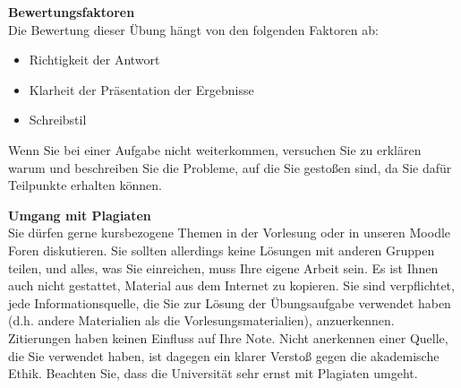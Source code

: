 \textbf{Bewertungsfaktoren}\\
Die Bewertung dieser Übung hängt von den folgenden Faktoren ab:
\begin{itemize}
    \item Richtigkeit der Antwort
    \item Klarheit der Präsentation der Ergebnisse
    \item Schreibstil
\end{itemize}
Wenn Sie bei einer Aufgabe nicht weiterkommen, versuchen Sie zu erklären warum und beschreiben Sie die Probleme, auf die Sie gestoßen sind,
da Sie dafür Teilpunkte erhalten können.


\textbf{Umgang mit Plagiaten}\\
Sie dürfen gerne kursbezogene Themen in der Vorlesung oder in unseren Moodle Foren diskutieren.
Sie sollten allerdings keine Lösungen mit anderen Gruppen teilen, und alles, was Sie einreichen, muss Ihre eigene Arbeit sein. Es ist Ihnen auch nicht gestattet, Material aus dem Internet zu kopieren. Sie sind verpflichtet, jede Informationsquelle, die Sie zur Lösung der Übungsaufgabe verwendet haben (d.h. andere Materialien als die Vorlesungsmaterialien), anzuerkennen. Zitierungen haben keinen Einfluss auf Ihre Note. Nicht anerkennen einer Quelle, die Sie verwendet haben, ist dagegen ein klarer Verstoß gegen die akademische Ethik. Beachten Sie, dass die Universität sehr ernst mit Plagiaten umgeht.
